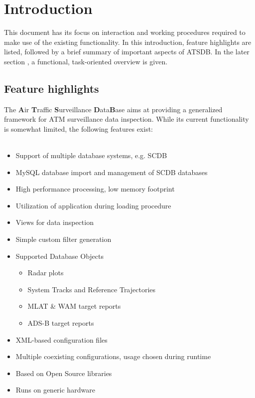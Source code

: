 \chapter{Introduction}

This document has its focus on interaction and working procedures required to make use of the existing
functionality. In this introduction, feature highlights are listed, followed by a brief summary of important aspects of  ATSDB. In the later section , a functional, task-oriented overview is given. 

\section{Feature highlights}

The \textbf{A}ir \textbf{T}raffic \textbf{S}urveillance \textbf{D}ata\textbf{B}ase aims at providing a generalized framework for ATM surveillance data inspection. While its current functionality is somewhat limited, the following features exist:\\\\

\begin{itemize}  
\item Support of multiple database systems, e.g. SCDB
\item MySQL database import and management of SCDB databases
\item High performance processing, low memory footprint
\item Utilization of application during loading procedure
\item Views for data inspection
\item Simple custom filter generation
\item Supported Database Objects
\begin{itemize}  
\item Radar plots
\item System Tracks and Reference Trajectories
\item MLAT \& WAM target reports
\item ADS-B target reports
\end{itemize}
\item XML-based configuration files
\item Multiple coexisting configurations, usage chosen during runtime
\item Based on Open Source libraries
\item Runs on generic hardware
\end{itemize}


